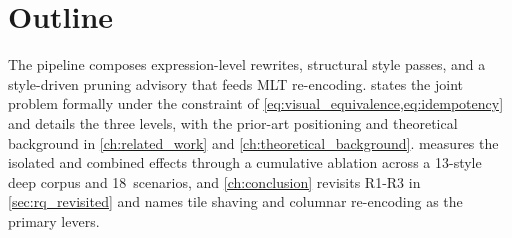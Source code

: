 \section{Outline}\label{sec:outline}

The pipeline composes expression-level rewrites, structural style passes, and a style-driven pruning advisory that feeds \ac{MLT} re-encoding.  states the joint problem formally under the constraint of \cref{eq:visual_equivalence,eq:idempotency} and details the three levels, with the prior-art positioning and theoretical background in \cref{ch:related_work} and \cref{ch:theoretical_background}.
 measures the isolated and combined effects through a cumulative ablation across a 13-style deep corpus and 18~scenarios, and \cref{ch:conclusion} revisits R1-R3 in \cref{sec:rq_revisited} and names tile shaving and columnar re-encoding as the primary levers.
